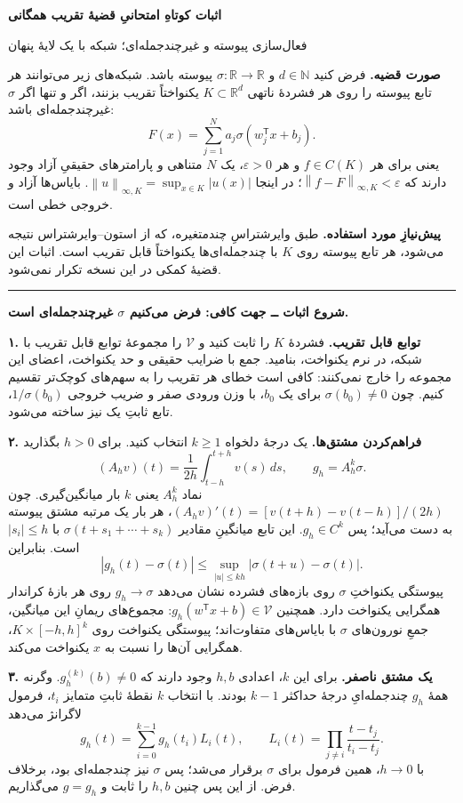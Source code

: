 \documentclass[12pt,a4paper]{article}
\newcommand{\R}{\mathbb R}
\newcommand{\V}{\mathcal V}
\newcommand{\normK}[1]{\left\lVert#1\right\rVert_{\infty,K}}
\newcommand{\step}[1]{\par\Needspace{3\baselineskip}\vspace{3pt}\textbf{#1}\quad}
\begin{document}
\begin{center}
{\Large\bfseries اثبات کوتاهِ امتحانیِ قضیهٔ تقریب همگانی}\par
{\small فعال‌سازی پیوسته و غیرچندجمله‌ای؛ شبکه با یک لایهٔ پنهان}
\end{center}

\textbf{صورت قضیه.}
فرض کنید $d\in\mathbb N$ و $\sigma:\R\to\R$ پیوسته باشد. شبکه‌های زیر می‌توانند هر تابع پیوسته را روی هر فشردهٔ ناتهی $K\subset\R^d$ یکنواختاً تقریب بزنند، اگر و تنها اگر $\sigma$ غیرچندجمله‌ای باشد:
\[
F(x)=\sum_{j=1}^{N}a_j\sigma(w_j^{\mathsf T}x+b_j).
\]
یعنی برای هر $f\in C(K)$ و هر $\varepsilon>0$، یک $N$ متناهی و پارامترهای حقیقیِ آزاد وجود دارند که $\normK{f-F}<\varepsilon$؛ در اینجا $\normK{u}=\sup_{x\in K}|u(x)|$. بایاس‌ها آزاد و خروجی خطی است.

\textbf{پیش‌نیازِ مورد استفاده.}
طبق وایرشتراسِ چندمتغیره، که از استون–وایرشتراس نتیجه می‌شود، هر تابع پیوسته روی $K$ با چندجمله‌ای‌ها یکنواختاً قابل تقریب است. اثبات این قضیهٔ کمکی در این نسخه تکرار نمی‌شود.

\vspace{3pt}\hrule\vspace{5pt}
\textbf{شروع اثبات ــ جهت کافی: فرض می‌کنیم $\sigma$ غیرچندجمله‌ای است.}

\step{۱. توابع قابل تقریب.}
فشردهٔ $K$ را ثابت کنید و $\V$ را مجموعهٔ توابع قابل تقریب با شبکه، در نرم یکنواخت، بنامید. جمع با ضرایب حقیقی و حد یکنواخت، اعضای این مجموعه را خارج نمی‌کنند: کافی است خطای هر تقریب را به سهم‌های کوچک‌تر تقسیم کنیم. چون $\sigma(b_0)\ne0$ برای یک $b_0$، با وزن ورودی صفر و ضریب خروجی $1/\sigma(b_0)$، تابع ثابتِ یک نیز ساخته می‌شود.

\step{۲. فراهم‌کردن مشتق‌ها.}
یک درجهٔ دلخواه $k\geq1$ انتخاب کنید. برای $h>0$ بگذارید
\[
(A_hv)(t)=\frac1{2h}\int_{t-h}^{t+h}v(s)\,ds,
\qquad g_h=A_h^k\sigma.
\]
نماد $A_h^k$ یعنی $k$ بار میانگین‌گیری. چون
$(A_hv)'(t)=[v(t+h)-v(t-h)]/(2h)$، هر بار یک مرتبه مشتق پیوسته به دست می‌آید؛ پس $g_h\in C^k$.
این تابع میانگینِ مقادیر $\sigma(t+s_1+\cdots+s_k)$ با $|s_i|\leq h$ است. بنابراین
\[
|g_h(t)-\sigma(t)|\leq\sup_{|u|\leq kh}|\sigma(t+u)-\sigma(t)|.
\]
پیوستگی یکنواختِ $\sigma$ روی بازه‌های فشرده نشان می‌دهد $g_h\to\sigma$ روی هر بازهٔ کراندار همگرایی یکنواخت دارد.
همچنین $g_h(w^{\mathsf T}x+b)\in\V$: مجموع‌های ریمانِ این میانگین، جمعِ نورون‌های $\sigma$ با بایاس‌های متفاوت‌اند؛ پیوستگی یکنواخت روی $K\times[-h,h]^k$، همگرایی آن‌ها را نسبت به $x$ یکنواخت می‌کند.

\step{۳. یک مشتق ناصفر.}
برای این $k$، اعدادی $h,b$ وجود دارند که $g_h^{(k)}(b)\ne0$. وگرنه همهٔ $g_h$ چندجمله‌ایِ درجهٔ حداکثر $k-1$ بودند. با انتخاب $k$ نقطهٔ ثابتِ متمایز $t_i$، فرمول لاگرانژ می‌دهد
\[
g_h(t)=\sum_{i=0}^{k-1}g_h(t_i)L_i(t),
\qquad L_i(t)=\prod_{j\ne i}\frac{t-t_j}{t_i-t_j}.
\]
با $h\to0$، همین فرمول برای $\sigma$ برقرار می‌شد؛ پس $\sigma$ نیز چندجمله‌ای بود، برخلاف فرض. از این پس چنین $h,b$ را ثابت و $g=g_h$ می‌گذاریم.
\end{document}
